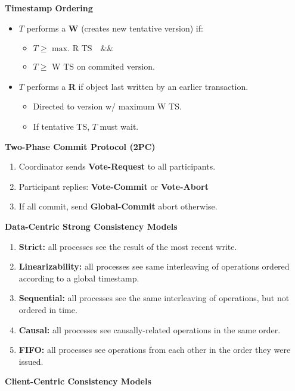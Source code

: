 \documentclass[a4paper, 10pt, twocolumn]{article}
\begin{document}
    \textbf{Timestamp Ordering}
    \begin{itemize}
        \item $T$ performs a \textbf{W} (creates new tentative version) if:
        \begin{itemize}
            \item $T \geq \text{ max. R TS} \quad \&\& $
            \item $T \geq \text{ W TS on commited version}$.
        \end{itemize}
        \item $T$ performs a \textbf{R} if object last written by an earlier transaction.
        \begin{itemize}
            \item Directed to version w/ maximum W TS.
            \item If tentative TS, $T$ must wait.
        \end{itemize}
    \end{itemize}

    \textbf{Two-Phase Commit Protocol (2PC)}
    \begin{enumerate}
        \item Coordinator sends \textbf{Vote-Request} to all participants.
        \item Participant replies: \textbf{Vote-Commit} or \textbf{Vote-Abort}
        \item If all commit, send \textbf{Global-Commit} abort otherwise.
    \end{enumerate}

    \textbf{Data-Centric Strong Consistency Models}
    \begin{enumerate}
        \item \textbf{Strict:} all processes see the result of the most recent write.
        \item \textbf{Linearizability:} all processes see same interleaving of operations ordered according to a global timestamp.
        \item \textbf{Sequential:} all processes see the same interleaving of operations, but not ordered in time.
        \item \textbf{Causal:} all processes see causally-related operations in the same order.
        \item \textbf{FIFO:} all processes see operations from each other in the order they were issued.
    \end{enumerate}

    \textbf{Client-Centric Consistency Models}
\end{document}
